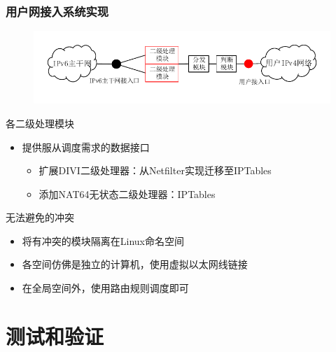 \documentclass{beamer}
\begin{document}
\begin{frame}
  \frametitle{用户网接入系统实现}
  \vspace{-1em}
  \begin{figure}
    \includegraphics[width=\textwidth]{figs/10-user-access-point-d.pdf}
  \end{figure}
  \vspace{-2em}

  \begin{block}{各二级处理模块}
    \begin{itemize}
    \item 提供服从调度需求的数据接口
      \begin{itemize}
      \item 扩展DIVI二级处理器：从Netfilter实现迁移至IPTables
      \item 添加NAT64无状态二级处理器：IPTables
      \end{itemize}
    \end{itemize}
  \end{block}

  \begin{block}{无法避免的冲突}
    \begin{itemize}
    \item 将有冲突的模块隔离在Linux命名空间
    \item 各空间仿佛是独立的计算机，使用虚拟以太网线链接
    \item 在全局空间外，使用路由规则调度即可
    \end{itemize}
  \end{block}
\end{frame}

\section{测试和验证}
\end{document}
